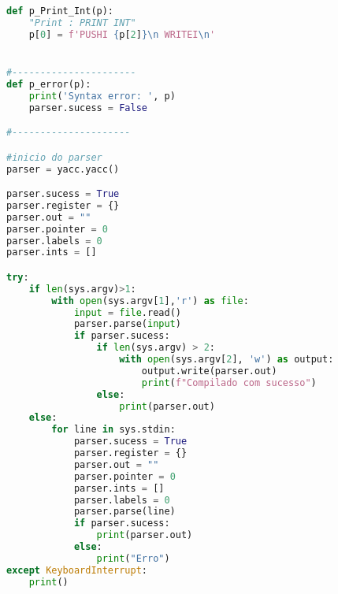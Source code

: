 \documentclass[11pt,a4paper]{report}
\begin{document}
\begin{lstlisting}[language=python,firstnumber=1]
def p_Print_Int(p):
    "Print : PRINT INT"
    p[0] = f'PUSHI {p[2]}\n WRITEI\n'


#----------------------
def p_error(p):
    print('Syntax error: ', p)
    parser.sucess = False

#---------------------

#inicio do parser
parser = yacc.yacc()

parser.sucess = True
parser.register = {}
parser.out = ""
parser.pointer = 0
parser.labels = 0
parser.ints = []

try:
    if len(sys.argv)>1:
        with open(sys.argv[1],'r') as file:
            input = file.read()
            parser.parse(input)
            if parser.sucess:
                if len(sys.argv) > 2:
                    with open(sys.argv[2], 'w') as output:
                        output.write(parser.out)
                        print(f"Compilado com sucesso")
                else:
                    print(parser.out)
    else:
        for line in sys.stdin:
            parser.sucess = True
            parser.register = {}
            parser.out = ""
            parser.pointer = 0
            parser.ints = []
            parser.labels = 0
            parser.parse(line)
            if parser.sucess:
                print(parser.out)
            else:
                print("Erro")
except KeyboardInterrupt:
    print()

                        
    \end{lstlisting}
   
	
\end{document}

